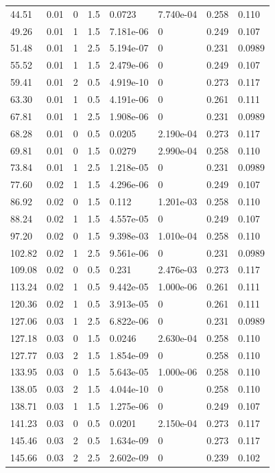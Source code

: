 \documentclass[preview]{standalone}
\begin{document}
{{\begin{tabular}{L{1.2cm}C{1.2cm} C{0.3cm}C{0.5cm} C{1.4cm}C{1.4cm} C{1.4cm}C{1.4cm}}
  44.51  &  0.01  & 0     & 1.5 &  0.0723  & 7.740e-04  & 0.258 &  0.110   \\ 
  49.26  &  0.01  & 1     & 1.5 &  7.181e-06  & 0  & 0.249 &  0.107   \\ 
  51.48  &  0.01  & 1     & 2.5 &  5.194e-07  & 0  & 0.231 &  0.0989   \\ 
  55.52  &  0.01  & 1     & 1.5 &  2.479e-06  & 0  & 0.249 &  0.107   \\ 
  59.41  &  0.01  & 2     & 0.5 &  4.919e-10  & 0  & 0.273 &  0.117   \\ 
  63.30  &  0.01  & 1     & 0.5 &  4.191e-06  & 0  & 0.261 &  0.111   \\ 
  67.81  &  0.01  & 1     & 2.5 &  1.908e-06  & 0  & 0.231 &  0.0989   \\ 
  68.28  &  0.01  & 0     & 0.5 &  0.0205  & 2.190e-04  & 0.273 &  0.117   \\ 
  69.81  &  0.01  & 0     & 1.5 &  0.0279  & 2.990e-04  & 0.258 &  0.110   \\ 
  73.84  &  0.01  & 1     & 2.5 &  1.218e-05  & 0  & 0.231 &  0.0989   \\ 
  77.60  &  0.02  & 1     & 1.5 &  4.296e-06  & 0  & 0.249 &  0.107   \\ 
  86.92  &  0.02  & 0     & 1.5 &  0.112  & 1.201e-03  & 0.258 &  0.110   \\ 
  88.24  &  0.02  & 1     & 1.5 &  4.557e-05  & 0  & 0.249 &  0.107   \\ 
  97.20  &  0.02  & 0     & 1.5 &  9.398e-03  & 1.010e-04  & 0.258 &  0.110   \\ 
  102.82  &  0.02  & 1     & 2.5 &  9.561e-06  & 0  & 0.231 &  0.0989   \\ 
  109.08  &  0.02  & 0     & 0.5 &  0.231  & 2.476e-03  & 0.273 &  0.117   \\ 
  113.24  &  0.02  & 1     & 0.5 &  9.442e-05  & 1.000e-06  & 0.261 &  0.111   \\ 
  120.36  &  0.02  & 1     & 0.5 &  3.913e-05  & 0  & 0.261 &  0.111   \\ 
  127.06  &  0.03  & 1     & 2.5 &  6.822e-06  & 0  & 0.231 &  0.0989   \\ 
  127.18  &  0.03  & 0     & 1.5 &  0.0246  & 2.630e-04  & 0.258 &  0.110   \\ 
  127.77  &  0.03  & 2     & 1.5 &  1.854e-09  & 0  & 0.258 &  0.110   \\ 
  133.95  &  0.03  & 0     & 1.5 &  5.643e-05  & 1.000e-06  & 0.258 &  0.110   \\ 
  138.05  &  0.03  & 2     & 1.5 &  4.044e-10  & 0  & 0.258 &  0.110   \\ 
  138.71  &  0.03  & 1     & 1.5 &  1.275e-06  & 0  & 0.249 &  0.107   \\ 
  141.23  &  0.03  & 0     & 0.5 &  0.0201  & 2.150e-04  & 0.273 &  0.117   \\ 
  145.46  &  0.03  & 2     & 0.5 &  1.634e-09  & 0  & 0.273 &  0.117   \\ 
  145.66  &  0.03  & 2     & 2.5 &  2.602e-09  & 0  & 0.239 &  0.102   \\ 
\hline 
\end{tabular} 

}}
\end{document}
